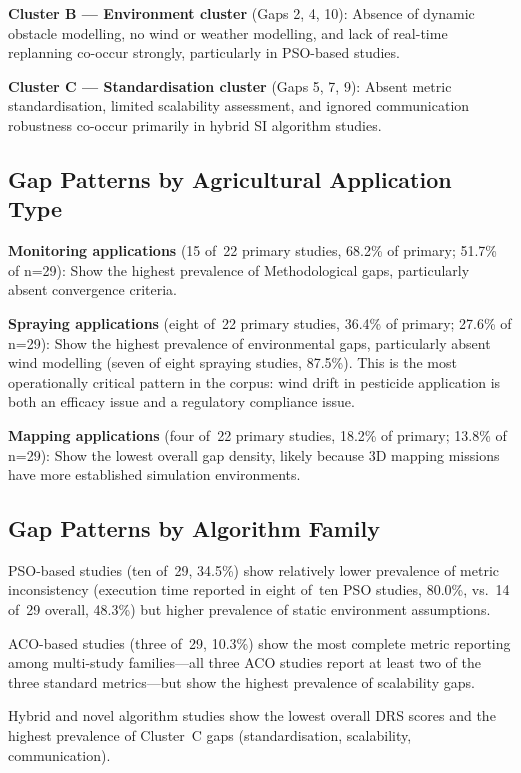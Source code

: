 \documentclass[review,3p]{elsarticle}
\begin{document}
\textbf{Cluster B --- Environment cluster} (Gaps 2, 4, 10): Absence of dynamic
obstacle modelling, no wind or weather modelling, and lack of real-time
replanning co-occur strongly, particularly in PSO-based studies.

\textbf{Cluster C --- Standardisation cluster} (Gaps 5, 7, 9): Absent metric
standardisation, limited scalability assessment, and ignored communication
robustness co-occur primarily in hybrid SI algorithm studies.

\subsection{Gap Patterns by Agricultural Application Type}

\textbf{Monitoring applications} (15 of~22 primary studies, 68.2\% of primary;
51.7\% of n=29): Show the highest prevalence of Methodological gaps, particularly
absent convergence criteria.

\textbf{Spraying applications} (eight of~22 primary studies, 36.4\% of primary;
27.6\% of n=29): Show the highest prevalence of environmental gaps, particularly
absent wind modelling (seven of eight spraying studies, 87.5\%). This is the
most operationally critical pattern in the corpus: wind drift in pesticide
application is both an efficacy issue and a regulatory compliance issue.

\textbf{Mapping applications} (four of~22 primary studies, 18.2\% of primary;
13.8\% of n=29): Show the lowest overall gap density, likely because 3D mapping
missions have more established simulation environments.

\subsection{Gap Patterns by Algorithm Family}

PSO-based studies (ten of~29, 34.5\%) show relatively lower prevalence of
metric inconsistency (execution time reported in eight of~ten PSO studies,
80.0\%, vs.\ 14 of~29 overall, 48.3\%) but higher prevalence of static
environment assumptions.

ACO-based studies (three of~29, 10.3\%) show the most complete metric reporting
among multi-study families---all three ACO studies report at least two of the
three standard metrics---but show the highest prevalence of scalability gaps.

Hybrid and novel algorithm studies show the lowest overall DRS scores and the
highest prevalence of Cluster~C gaps (standardisation, scalability,
communication).
\end{document}
